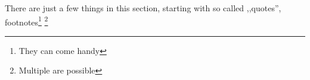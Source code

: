 There are just a few things in this section, starting with so called ,,quotes'', footnotes\footnote{They can come handy} \footnote{Multiple are possible}